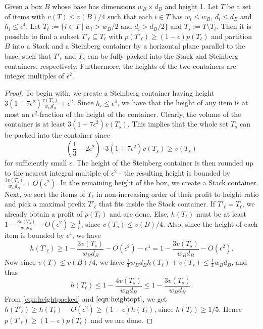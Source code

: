 \begin{lemma}
\label{lem:stackandsteincombine}
    Given a box $B$ whose base has dimensions $w_B\times d_B$ and height 1. Let $T$ be a set of items with $v(T)\le v(B)/4$ such that each $i\in T$ has $w_i \le w_B$, $d_i \le d_B$ and  $h_i\le \epsilon^4$. Let $T_{\ell} := \{i\in T \mid w_i > w_B/2 \text{ and } d_i > d_B/2\}$ and $T_s := T\setminus T_{\ell}$. Then it is possible to find a subset $T'_{\ell}\subseteq T_{\ell}$ with $p(T'_{\ell}) \ge (1-\epsilon)p(T_{\ell})$ and partition $B$ into a Stack and a Steinberg container by a horizontal plane parallel to the base, such that $T'_{\ell}$ and $T_s$ can be fully packed into the Stack and Steinberg containers, respectively. Furthermore, the heights of the two containers are integer multiples of $\epsilon^2$.
\end{lemma}
\begin{proof}
    To begin with, we create a Steinberg container having height $3(1+7\epsilon^2)\frac{v(T_s)}{w_Bd_B}+\epsilon^2$. Since $h_i \le \epsilon^4$, we have that the height of any item is at most an $\epsilon^2$-fraction of the height of the container. Clearly, the volume of the container is at least $3(1+7\epsilon^2)v(T_s)$. This implies that the whole set $T_s$ can be packed into the container since 
    \[ \left(\frac{1}{3}-2\epsilon^2\right)\cdot 3(1+7\epsilon^2)v(T_s) \ge v(T_s)\]
    for sufficiently small $\epsilon$. The height of the Steinberg container is then rounded up to the nearest integral multiple of $\epsilon^2$ - the resulting height is bounded by $\frac{3v(T_s)}{w_Bd_B}+O(\epsilon^2)$. In the remaining height of the box, we create a Stack container. Next, we sort the items of $T_{\ell}$ in non-increasing order of their profit to height ratio and pick a maximal prefix $T'_{\ell}$ that fits inside the Stack container. If $T'_{\ell} = T_{\ell}$, we already obtain a profit of $p(T_{\ell})$ and are done. Else, $h(T_{\ell})$ must be at least $1-\frac{3v(T_s)}{w_Bd_B}-O(\epsilon^2) \ge \frac{1}{5}$, since $v(T_s) \le v(B)/4$. Also, since the height of each item is bounded by $\epsilon^4$, we have 
    \begin{equation}
    \label{eqn:heightpacked}
        h(T'_{\ell}) \ge 1-\frac{3v(T_s)}{w_Bd_B}-O(\epsilon^2) - \epsilon^4 = 1-\frac{3v(T_s)}{w_Bd_B}-O(\epsilon^2).
    \end{equation}
    Now since $v(T) \le v(B)/4$, we have $\frac{1}{4}w_Bd_Bh(T_{\ell}) + v(T_s) \le \frac{1}{4}w_Bd_B$, and thus
    \begin{equation}
    \label{eqn:heightopt}
        h(T_{\ell}) \le 1 - \frac{4v(T_s)}{w_Bd_B}\le 1-\frac{3v(T_s)}{w_Bd_B}.
    \end{equation}
    From \eqref{eqn:heightpacked} and $\eqref{eqn:heightopt}$, we get $h(T'_{\ell}) \ge h(T_{\ell})-O(\epsilon^2) \ge (1-\epsilon)h(T_{\ell})$, since $h(T_{\ell})\ge 1/5$. Hence $p(T'_{\ell})\ge (1-\epsilon)p(T_{\ell})$ and we are done.   
\end{proof}


